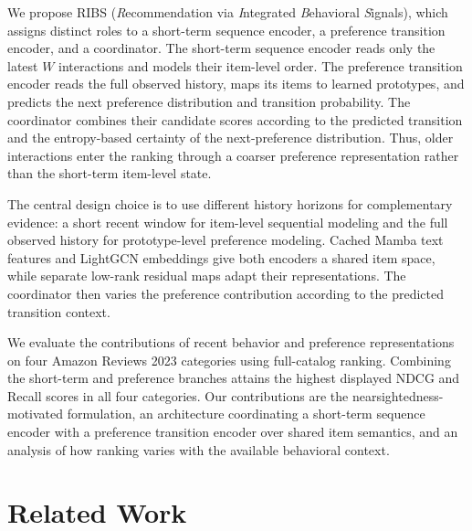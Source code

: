 \documentclass[11pt]{article}
\begin{document}
We propose RIBS (\emph{R}ecommendation via \emph{I}ntegrated \emph{B}ehavioral \emph{S}ignals), which assigns distinct roles to a short-term sequence encoder, a preference transition encoder, and a coordinator. The short-term sequence encoder reads only the latest $W$ interactions and models their item-level order. The preference transition encoder reads the full observed history, maps its items to learned prototypes, and predicts the next preference distribution and transition probability. The coordinator combines their candidate scores according to the predicted transition and the entropy-based certainty of the next-preference distribution. Thus, older interactions enter the ranking through a coarser preference representation rather than the short-term item-level state.

The central design choice is to use different history horizons for complementary evidence: a short recent window for item-level sequential modeling and the full observed history for prototype-level preference modeling. Cached Mamba \cite{Mamba} text features and LightGCN \cite{LightGCN} embeddings give both encoders a shared item space, while separate low-rank residual maps adapt their representations. The coordinator then varies the preference contribution according to the predicted transition context.

We evaluate the contributions of recent behavior and preference representations on four Amazon Reviews 2023 categories using full-catalog ranking. Combining the short-term and preference branches attains the highest displayed NDCG and Recall scores in all four categories. Our contributions are the nearsightedness-motivated formulation, an architecture coordinating a short-term sequence encoder with a preference transition encoder over shared item semantics, and an analysis of how ranking varies with the available behavioral context.

\section{Related Work}
\end{document}
